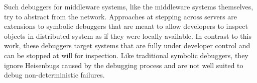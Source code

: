 Such debuggers for middleware systems, like the middleware systems
themselves, try to abstract from the network. Approaches at stepping
across servers are extensions to symbolic debuggers that are meant to
allow developers to inspect objects in distributed system as if they
were locally available. In contrast to this work, these debuggers
target systems that are fully under developer control and can be
stopped at will for inspection. Like traditional symbolic debuggers,
they ignore Heisenbugs caused by the debugging process and are not
well suited to debug non-deterministic failures.

